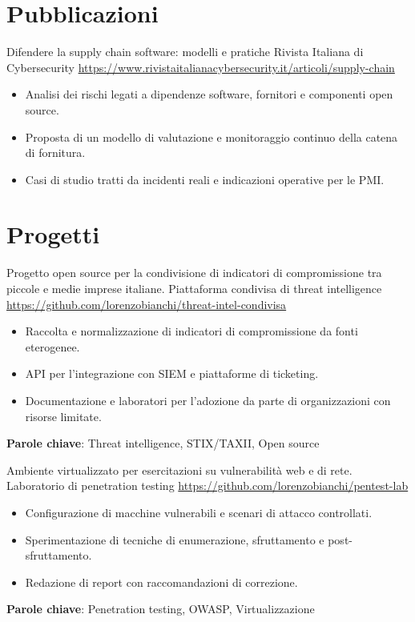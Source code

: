 \documentclass[a4paper, serif, 10pt]{moderncv}
\begin{document}
\section{Pubblicazioni}

        {Difendere la supply chain software: modelli e pratiche}
        {Rivista Italiana di Cybersecurity}
        {\url{https://www.rivistaitalianacybersecurity.it/articoli/supply-chain}}
        {}
        {\begin{itemize}
\item Analisi dei rischi legati a dipendenze software, fornitori e componenti open source.
\item Proposta di un modello di valutazione e monitoraggio continuo della catena di fornitura.
\item Casi di studio tratti da incidenti reali e indicazioni operative per le PMI.
\end{itemize}}
\section{Progetti}

        {Progetto open source per la condivisione di indicatori di compromissione tra piccole e medie imprese italiane.}
        {Piattaforma condivisa di threat intelligence}
        {\url{https://github.com/lorenzobianchi/threat-intel-condivisa}}
        {}
        {\begin{itemize}
\item Raccolta e normalizzazione di indicatori di compromissione da fonti eterogenee.
\item API per l'integrazione con SIEM e piattaforme di ticketing.
\item Documentazione e laboratori per l'adozione da parte di organizzazioni con risorse limitate.
\end{itemize}
\textbf{Parole chiave}: Threat intelligence, STIX/TAXII, Open source}

        {Ambiente virtualizzato per esercitazioni su vulnerabilità web e di rete.}
        {Laboratorio di penetration testing}
        {\url{https://github.com/lorenzobianchi/pentest-lab}}
        {}
        {\begin{itemize}
\item Configurazione di macchine vulnerabili e scenari di attacco controllati.
\item Sperimentazione di tecniche di enumerazione, sfruttamento e post-sfruttamento.
\item Redazione di report con raccomandazioni di correzione.
\end{itemize}
\textbf{Parole chiave}: Penetration testing, OWASP, Virtualizzazione}
\end{document}

